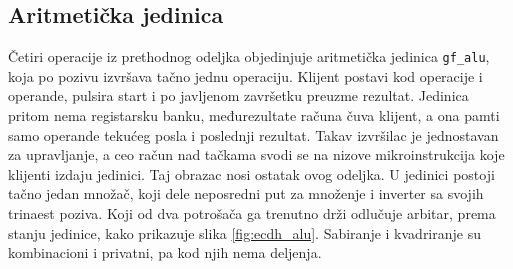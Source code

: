 \subsection{Aritmetička jedinica}
\label{subsec:hw_ecdh_alu}

Četiri operacije iz prethodnog odeljka objedinjuje aritmetička jedinica \texttt{gf\_alu}, koja po pozivu izvršava tačno jednu operaciju. Klijent postavi kod operacije i operande, pulsira start i po javljenom završetku preuzme rezultat. Jedinica pritom nema registarsku banku, međurezultate računa čuva klijent, a ona pamti samo operande tekućeg posla i poslednji rezultat. Takav izvršilac je jednostavan za upravljanje, a ceo račun nad tačkama svodi se na nizove mikroinstrukcija koje klijenti izdaju jedinici. Taj obrazac nosi ostatak ovog odeljka.
\smallbreak
U jedinici postoji tačno jedan množač, koji dele neposredni put za množenje i inverter sa svojih trinaest poziva. Koji od dva potrošača ga trenutno drži odlučuje arbitar, prema stanju jedinice, kako prikazuje slika \ref{fig:ecdh_alu}. Sabiranje i kvadriranje su kombinacioni i privatni, pa kod njih nema deljenja.

